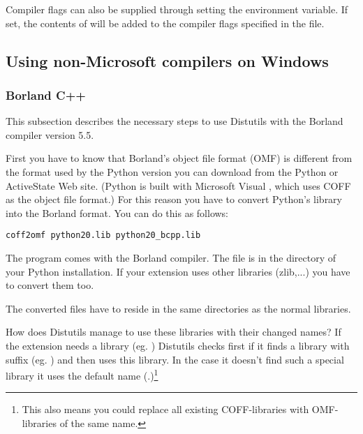 \documentclass{howto}
\begin{document}
Compiler flags can also be supplied through setting the
 environment variable.  If set, the contents of
 will be added to the compiler flags specified in the 
 file.


\subsection{Using non-Microsoft compilers on Windows \label{non-ms-compilers}}

\subsubsection{Borland C++}

This subsection describes the necessary steps to use Distutils with the 
Borland \Cpp{} compiler version 5.5.

First you have to know that Borland's object file format (OMF) is
different from the format used by the Python version you can download
from the Python or ActiveState Web site.  (Python is built with
Microsoft Visual \Cpp, which uses COFF as the object file format.)
For this reason you have to convert Python's library
 into the Borland format.  You can do this as
follows:

\begin{verbatim}
coff2omf python20.lib python20_bcpp.lib
\end{verbatim}

The  program comes with the Borland compiler.  The file
 is in the  directory of your Python
installation.  If your extension uses other libraries (zlib,...) you
have to convert them too.

The converted files have to reside in the same directories as the
normal libraries.

How does Distutils manage to use these libraries with their changed
names?  If the extension needs a library (eg. ) Distutils
checks first if it finds a library with suffix 
(eg. ) and then uses this library.  In the case it
doesn't find such a special library it uses the default name
(.)\footnote{This also means you could replace all
existing COFF-libraries with OMF-libraries of the same name.}
\end{document}
